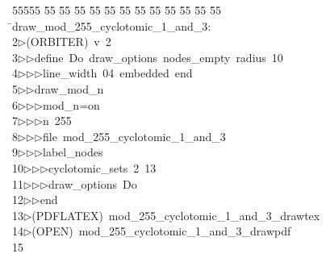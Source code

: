 %
%
\begin{tabbing}
55555 \= 55 \= 55 \= 55 \= 55 \= 55 \= 55 \= 55 \= 55 \= 55 \= 55 \= 55 \= 55 \= \>draw\_mod\_255\_cyclotomic\_1\_and\_3:\\[0pt]
2\>$\triangleright$\>(ORBITER)\ v\ 2\ \\[0pt]
3\>$\triangleright$\>$\triangleright$\>define\ Do\ draw\_options\ nodes\_empty\ radius\ 10\ \\[0pt]
4\>$\triangleright$\>$\triangleright$\>$\triangleright$\>line\_width\ 04\ embedded\ end\ \\[0pt]
5\>$\triangleright$\>$\triangleright$\>draw\_mod\_n\ \\[0pt]
6\>$\triangleright$\>$\triangleright$\>$\triangleright$\>mod\_n=on\ \\[0pt]
7\>$\triangleright$\>$\triangleright$\>$\triangleright$\>n\ 255\ \\[0pt]
8\>$\triangleright$\>$\triangleright$\>$\triangleright$\>file\ mod\_255\_cyclotomic\_1\_and\_3\ \\[0pt]
9\>$\triangleright$\>$\triangleright$\>$\triangleright$\>label\_nodes\ \\[0pt]
10\>$\triangleright$\>$\triangleright$\>$\triangleright$\>cyclotomic\_sets\ 2\ 13\ \\[0pt]
11\>$\triangleright$\>$\triangleright$\>$\triangleright$\>draw\_options\ Do\ \\[0pt]
12\>$\triangleright$\>$\triangleright$\>end\\[0pt]
13\>$\triangleright$\>(PDFLATEX)\ mod\_255\_cyclotomic\_1\_and\_3\_drawtex\\[0pt]
14\>$\triangleright$\>(OPEN)\ mod\_255\_cyclotomic\_1\_and\_3\_drawpdf\\[0pt]
15\>\end{tabbing}
